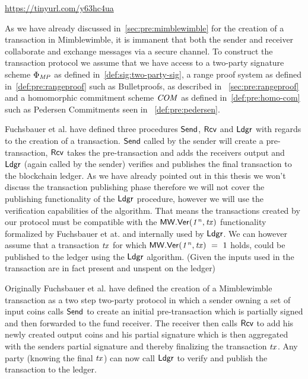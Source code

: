 \urldef\urlgrinexplained\url{https://tinyurl.com/y63hc4ua}

As we have already discussed in~\cref{sec:pre:mimblewimble} for the creation of a transaction in Mimblewimble, it is immanent that both the sender and receiver collaborate and exchange messages via a secure channel.
To construct the transaction protocol we assume that we have access to a two-party signature scheme $\Phi_{\mathit{MP}}$ as defined in~\cref{def:sig:two-party-sig}, a  range proof system as defined in~\cref{def:pre:rangeproof} such as Bulletproofs, as described in ~\cref{sec:pre:rangeproof} and a homomorphic commitment scheme $\mathit{COM}$ as defined in~\cref{def:pre:homo-com} such as Pedersen Commitments seen in ~\cref{def:pre:pedersen}.

Fuchsbauer et al. have defined three procedures $\mathsf{Send}$, $\mathsf{Rcv}$ and $\mathsf{Ldgr}$ with regards to the creation of a transaction.
$\mathsf{Send}$ called by the sender will create a pre-transaction, $\mathsf{Rcv}$ takes the pre-transaction and adds the receivers output and $\mathsf{Ldgr}$ (again called by the sender) verifies and publishes the final transaction to the blockchain ledger.
As we have already pointed out in this thesis we won't discuss the transaction publishing phase therefore we will not cover the publishing functionality of the $\mathsf{Ldgr}$ procedure, however we will use the verification capabilities of the algorithm.
That means the transactions created by our protocol must be compatible with the $\mathsf{MW.Ver(\mathit{1^n}, \mathit{tx})}$ functionality formalized by Fuchsbauer et at. and internally used by $\mathsf{Ldgr}$.
We can however assume that a transaction $\mathit{tx}$ for which $\mathsf{MW.Ver(\mathit{1^n}, \mathit{tx})} ~=~ 1$ holds, could be published to the ledger using the $\mathsf{Ldgr}$ algorithm. (Given the inputs used in the transaction are in fact present and unspent on the ledger)

Originally Fuchsbauer et al. have defined the creation of a Mimblewimble transaction as a two step two-party protocol in which a sender owning a set of input coins calls $\mathsf{Send}$ to create an initial pre-transaction which is partially signed and then forwarded to the fund receiver.
The receiver then calls $\mathsf{Rcv}$ to add his newly created output coins and his partial signature which is then aggregated with the senders partial signature and thereby finalizing the transaction $\mathit{tx}$.
Any party (knowing the final $\mathit{tx}$) can now call $\mathsf{Ldgr}$ to verify and publish the transaction to the ledger.

